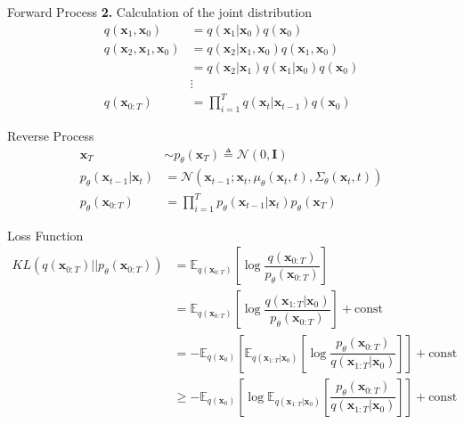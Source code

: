 \begin{frame}{Forward Process}
\textbf{2.} Calculation of the joint distribution
\begin{align*}    
q(\mathbf{x}_1,\mathbf{x}_0)
&=q(\mathbf{x}_1|\mathbf{x}_0)q(\mathbf{x}_0)\\
q(\mathbf{x}_2,\mathbf{x}_1,\mathbf{x}_0)
&=q(\mathbf{x}_2|\mathbf{x}_1,\mathbf{x}_0)q(\mathbf{x}_1,\mathbf{x}_0)\\
&=q(\mathbf{x}_2|\mathbf{x}_1)q(\mathbf{x}_1|\mathbf{x}_0)q(\mathbf{x}_0)\\
&\vdots\\
q(\mathbf{x}_{0:T})&=\prod\limits_{i=1}^Tq(\mathbf{x}_t|\mathbf{x}_{t-1})q(\mathbf{x}_0)
\end{align*}
\end{frame}


\begin{frame}{Reverse Process}
\begin{align}
    \mathbf{x}_T&\sim p_\theta(\mathbf{x}_T)\triangleq\mathcal{N}(0,\mathbf{I})\\
    p_\theta(\mathbf{x}_{t-1}|\mathbf{x}_t) &= \mathcal{N}(\mathbf{x}_{t-1};\mathbf{x}_t,\mu_\theta(\mathbf{x}_t,t),\Sigma_\theta(\mathbf{x}_t,t))\\
    p_\theta(\mathbf{x}_{0:T})&=\prod\limits_{i=1}^T p_\theta(\mathbf{x}_{t-1}|\mathbf{x}_t)p_\theta(\mathbf{x}_T)
\end{align}
\end{frame}

\begin{frame}{Loss Function}
\begin{align*}
    KL(q(\mathbf{x}_{0:T})||p_\theta(\mathbf{x}_{0:T})) &= \mathbb{E}_{q(\mathbf{x}_{0:T})}\left[\log\dfrac{q(\mathbf{x}_{0:T})}{p_\theta(\mathbf{x}_{0:T})}\right]\\
   &= \mathbb{E}_{q(\mathbf{x}_{0:T})}\left[\log\dfrac{q(\mathbf{x}_{1:T}|\mathbf{x}_0)}{p_\theta(\mathbf{x}_{0:T})}\right]+\mathrm{const}\\
   &=-\mathbb{E}_{q(\mathbf{x}_0)}\left[\mathbb{E}_{q(\mathbf{x}_{1:T}|\mathbf{x}_0)}\left[\log\dfrac{p_\theta(\mathbf{x}_{0:T})}{q(\mathbf{x}_{1:T}|\mathbf{x}_0)}\right]\right]+\mathrm{const}\\
   &\ge-\mathbb{E}_{q(\mathbf{x}_0)}\left[\log\mathbb{E}_{q(\mathbf{x}_{1:T}|\mathbf{x}_0)}\left[\dfrac{p_\theta(\mathbf{x}_{0:T})}{q(\mathbf{x}_{1:T}|\mathbf{x}_0)}\right]\right]+\mathrm{const}\\
\end{align*}

\end{frame}

